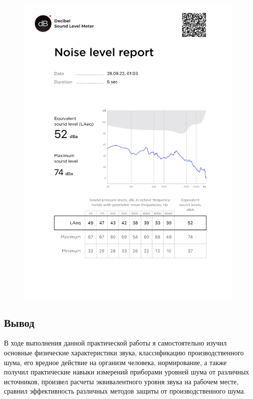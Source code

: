 \documentclass[a5paper, 12dd, twoside]{article}
\begin{document}
\begin{figure}[p]
    \centering
    \includegraphics[keepaspectratio, scale=0.6]{data/3.png}
\end{figure}

\subsection*{Вывод}
В ходе выполнения данной практической работы я самостоятельно изучил основные физические характеристики звука, классификацию производственного шума, его вредное действие на организм человека, нормирование, а также получил практические навыки измерений приборами уровней шума от различных источников, произвел расчеты эквивалентного уровня звука на рабочем месте, сравнил эффективность различных методов защиты от производственного шума.
\end{document}
